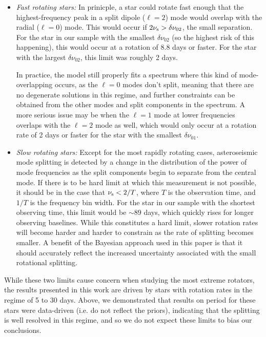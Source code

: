 \documentclass[12pt]{article}
\begin{document}
\begin{itemize}
	\item \textit{Fast rotating stars:} In prinicple, a star could rotate fast enough that the highest-frequency peak in a split dipole ($\ell = 2$) mode would overlap with the radial ($\ell = 0$) mode. This would occur if $2\nu_{\rm s} > \delta\nu_{02}$, the small separation. For the star in our sample with the smallest $\delta\nu_{02}$ (so the highest risk of this happening), this would occur at a rotation of 8.8 days or faster. For the star with the largest $\delta\nu_{02}$, this limit was roughly 2 days.
	
	In practice, the model still properly fits a spectrum where this kind of mode-overlapping occurs, as the $\ell = 0$ modes don't split, meaning that there are no degenerate solutions in this regime, and further constraints can be obtained from the other modes and split components in the spectrum. A more serious issue may be when the $\ell = 1$ mode at lower frequencies overlaps with the $\ell = 2$ mode as well, which would only occur at a rotation rate of 2 days or faster for the star with the smallest $\delta\nu_{01}$.
	
	\item \textit{Slow rotating stars:} Except for the most rapidly rotating cases, asteroseismic mode splitting is detected by a change in the distribution of the power of mode frequencies as the split components begin to separate from the central mode. If there is to be hard limit at which this measurement is not possible, it should be in the case that $\nu_{\rm s} < 2/T$, where $T$ is the observation time, and $1/T$ is the frequency bin width. For the star in our sample with the shortest observing time, this limit would be $\sim 89$ days, which quickly rises for longer observing baselines. While this constitutes a hard limit, slower rotation rates will become harder and harder to constrain as the rate of splitting becomes smaller. A benefit of the Bayesian approach used in this paper is that it should accurately reflect the increased uncertainty associated with the small rotational splitting.
\end{itemize}

While these two limits cause concern when studying the most extreme rotators, the results presented in this work are driven by stars with rotation rates in the regime of 5 to 30 days. Above, we demonstrated that results on period for these stars were data-driven (i.e. do not reflect the priors), indicating that the splitting is well resolved in this regime, and so we do not expect these limits to bias our conclusions.
\end{document}
